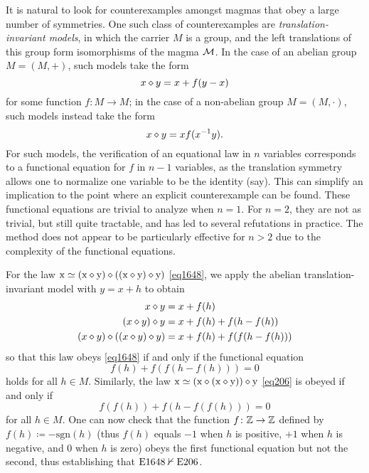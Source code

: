 It is natural to look for counterexamples amongst magmas that obey a large number of symmetries.  One such class of counterexamples are \emph{translation-invariant models}, in which the carrier $M$ is a group, and the left translations of this group form isomorphisms of the magma ${\mathcal{M}}$.  In the case of an abelian group $M = (M,+)$, such models take the form
\begin{equation}\label{xop-add}
  x \diamond y = x + f(y-x)
\end{equation}
for some function $f \colon M \to M$; in the case of a non-abelian group $M = (M,\cdot)$, such models instead take the form
\begin{equation}\label{xop-mul}
x \diamond y = x f(x^{-1} y).
\end{equation}
For such models, the verification of an equational law in $n$ variables corresponds to a functional equation for $f$ in $n-1$ variables, as the translation symmetry allows one to normalize one variable to be the identity (say). This can simplify an implication to the point where an explicit counterexample can be found.  These functional equations are trivial to analyze when $n=1$.  For $n=2$, they are not as trivial, but still quite tractable, and has led to several refutations in practice.  The method does not appear to be particularly effective for $n>2$ due to the complexity of the functional equations.

\begin{example}\label{abex}  For the law $\mathrm{x} \simeq (\mathrm{x} \diamond \mathrm{y}) \diamond ((\mathrm{x} \diamond \mathrm{y}) \diamond \mathrm{y})$ \eqref{eq1648}, we apply the abelian translation-invariant model  with $y=x+h$ to obtain
\begin{align*}
  x \diamond y &= x + f(h) \\
  (x \diamond y) \diamond y &= x + f(h) + f(h-f(h)) \\
  (x \diamond y) \diamond ((x \diamond y) \diamond y) &= x + f(h) + f(f(h-f(h)))
\end{align*}
so that this law obeys \eqref{eq1648} if and only if the functional equation
$$f(h) + f(f(h-f(h))) = 0$$
holds for all $h \in M$.  Similarly, the law $\mathrm{x} \simeq (\mathrm{x} \diamond (\mathrm{x} \diamond \mathrm{y})) \diamond \mathrm{y}$ \eqref{eq206} is obeyed if and only if
$$ f(f(h)) + f(h - f(f(h))) = 0$$
for all $h \in M$.  One can now check that the function $f \colon \mathbb{Z} \to \mathbb{Z}$ defined by $f(h) \coloneqq - \mathrm{sgn}(h)$ (thus $f(h)$ equals $-1$ when $h$ is positive, $+1$ when $h$ is negative, and $0$ when $h$ is zero) obeys the first functional equation but not the second, thus establishing that $\mathrm{E}1648 \nvdash \mathrm{E}206$.
\end{example}

